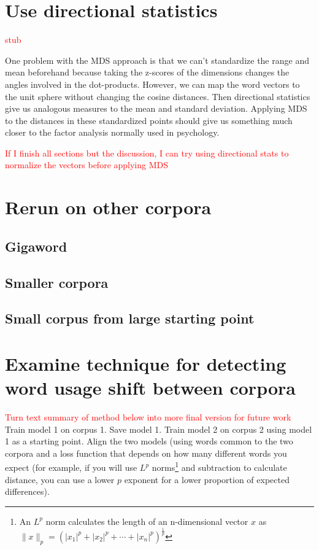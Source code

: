 \documentclass[10pt,letterpaper]{book}
\newcommand{\todo}[1]{\textcolor{red}{#1}}
\begin{document}
\section{Use directional statistics}

\todo{stub}

One problem with the MDS approach is that we can't standardize the range and 
mean beforehand because taking the z-scores of the dimensions changes the 
angles involved in the dot-products. However, we can map the word vectors to 
the unit sphere without changing the cosine distances. Then directional 
statistics give us analogous measures to the mean and standard deviation. 
Applying MDS to the distances in these standardized points should give us 
something much closer to the factor analysis normally used in psychology.

\todo{If I finish all sections but the discussion, I can try using directional 
stats to normalize the vectors before applying MDS}

\section{Rerun on other corpora}

\subsection{Gigaword}
\subsection{Smaller corpora}
\subsection{Small corpus from large starting point}

\section{Examine technique for detecting word usage shift between corpora}

\todo{Turn text summary of method below into more final version for future work}
Train model 1 on corpus 1. Save model 1. Train model 2 on corpus 2 using model 1 as a starting point. Align the two models (using words common to the two corpora and a loss function that depends on how many different words you expect (for example, if you will use $L^p$ norms\footnote{An $L^p$ norm calculates the length of an n-dimensional vector $x$ as $\|x\|_p=\left(|x_1|^p+|x_2|^p+\dotsb+|x_n|^p\right)^{\frac{1}{p}}$} and subtraction to calculate distance, you can use a lower $p$ exponent for a lower proportion of expected differences).
\end{document}
